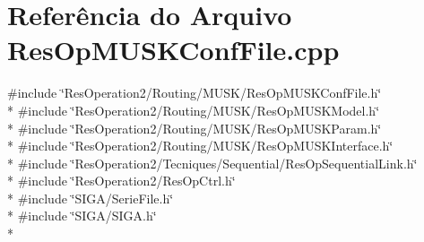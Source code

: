 \section{Referência do Arquivo Res\+Op\+M\+U\+S\+K\+Conf\+File.\+cpp}
\label{_res_op_m_u_s_k_conf_file_8cpp}
{\ttfamily \#include \char`\"{}Res\+Operation2/\+Routing/\+M\+U\+S\+K/\+Res\+Op\+M\+U\+S\+K\+Conf\+File.\+h\char`\"{}}\\*
{\ttfamily \#include \char`\"{}Res\+Operation2/\+Routing/\+M\+U\+S\+K/\+Res\+Op\+M\+U\+S\+K\+Model.\+h\char`\"{}}\\*
{\ttfamily \#include \char`\"{}Res\+Operation2/\+Routing/\+M\+U\+S\+K/\+Res\+Op\+M\+U\+S\+K\+Param.\+h\char`\"{}}\\*
{\ttfamily \#include \char`\"{}Res\+Operation2/\+Routing/\+M\+U\+S\+K/\+Res\+Op\+M\+U\+S\+K\+Interface.\+h\char`\"{}}\\*
{\ttfamily \#include \char`\"{}Res\+Operation2/\+Tecniques/\+Sequential/\+Res\+Op\+Sequential\+Link.\+h\char`\"{}}\\*
{\ttfamily \#include \char`\"{}Res\+Operation2/\+Res\+Op\+Ctrl.\+h\char`\"{}}\\*
{\ttfamily \#include \char`\"{}S\+I\+G\+A/\+Serie\+File.\+h\char`\"{}}\\*
{\ttfamily \#include \char`\"{}S\+I\+G\+A/\+S\+I\+G\+A.\+h\char`\"{}}\\*
